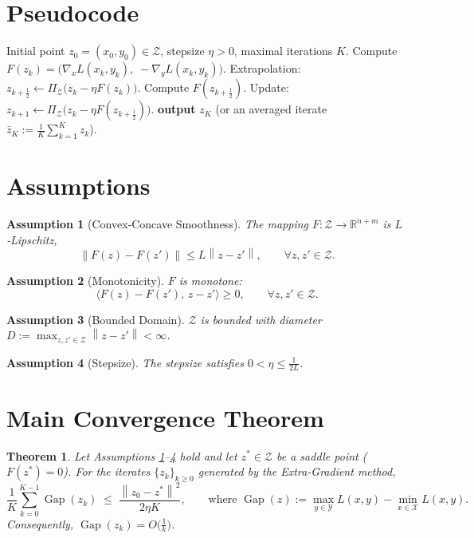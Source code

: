 \documentclass{article}
\newtheorem{theorem}{Theorem}
\newtheorem{assumption}{Assumption}
\newcommand{\R}{\mathbb{R}}
\newcommand{\norm}[1]{\left\|#1\right\|}
\newcommand{\gap}{\operatorname{Gap}}
\begin{document}
\section*{Pseudocode}
\begin{algorithm}[H]
\caption{Extra‑Gradient for $\min_{x}\max_{y}L(x,y)$}
\begin{algorithmic}[1]
\Require Initial point $z_{0}=(x_{0},y_{0})\in\mathcal Z$, stepsize $\eta>0$, maximal iterations $K$.
    \State Compute $F(z_{k})=\bigl(\nabla_{x}L(x_{k},y_{k}),\;-\nabla_{y}L(x_{k},y_{k})\bigr)$.
    \State Extrapolation: $z_{k+\frac12}\gets\Pi_{\mathcal Z}\bigl(z_{k}-\eta F(z_{k})\bigr)$.
    \State Compute $F(z_{k+\frac12})$.
    \State Update: $z_{k+1}\gets\Pi_{\mathcal Z}\bigl(z_{k}-\eta F(z_{k+\frac12})\bigr)$.
\EndFor
\State \textbf{output} $z_{K}$ (or an averaged iterate $\bar z_{K}:=\tfrac1K\sum_{k=1}^{K}z_{k}$).
\end{algorithmic}
\end{algorithm}

\section*{Assumptions}
\begin{assumption}[Convex‑Concave Smoothness]\label{as:lip}
The mapping $F:\mathcal Z\to\R^{n+m}$ is $L$‑Lipschitz,
\[
\norm{F(z)-F(z')}\le L\norm{z-z'},\qquad\forall z,z'\in\mathcal Z .
\]
\end{assumption}
\begin{assumption}[Monotonicity]\label{as:mono}
$F$ is monotone:
\[
\langle F(z)-F(z'),\,z-z'\rangle\ge0,\qquad\forall z,z'\in\mathcal Z .
\]
\end{assumption}
\begin{assumption}[Bounded Domain]\label{as:bounded}
$\mathcal Z$ is bounded with diameter $D:=\max_{z,z'\in\mathcal Z}\norm{z-z'}<\infty$.
\end{assumption}
\begin{assumption}[Stepsize]\label{as:stepsize}
The stepsize satisfies $0<\eta\le\frac{1}{2L}$.
\end{assumption}

\section*{Main Convergence Theorem}
\begin{theorem}\label{thm:rate}
Let Assumptions \ref{as:lip}–\ref{as:stepsize} hold and let $z^{*}\in\mathcal Z$ be a saddle point
($F(z^{*})=0$).  For the iterates $\{z_{k}\}_{k\ge0}$ generated by the Extra‑Gradient method,
\[
\frac{1}{K}\sum_{k=0}^{K-1}\gap(z_{k})\;\le\;
\frac{\norm{z_{0}-z^{*}}^{2}}{2\eta K},
\qquad\text{where }\gap(z):=\max_{y\in\mathcal Y}L(x,y)-\min_{x\in\mathcal X}L(x,y).
\]
Consequently, $\gap(z_{k})=O\!\bigl(\tfrac{1}{k}\bigr)$.
\end{theorem}
\end{document}
